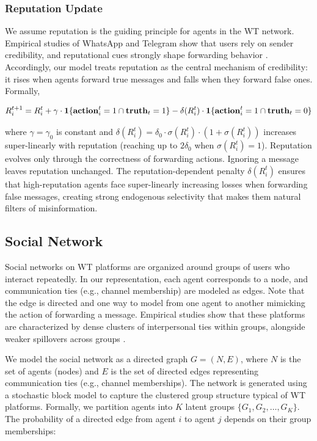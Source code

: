 \subsubsection{Reputation Update}
We assume reputation is the guiding principle for agents in the WT network. 
Empirical studies of WhatsApp and Telegram show that users rely on sender credibility, 
and reputational cues strongly shape forwarding behavior 
\citep{pasquetto2022social, herasimenka2022telegram}. 
Accordingly, our model treats reputation as the central mechanism of credibility: it rises 
when agents forward true messages and falls when they forward false ones. Formally,

\begin{equation}
R_i^{t+1} = R_i^t 
+ \gamma \cdot \mathbf{1}\{\mathbf{action}_i^t = 1 \cap \mathbf{truth}_t = 1\}
- \delta(R_i^t) \cdot \mathbf{1}\{\mathbf{action}_i^t = 1 \cap \mathbf{truth}_t = 0\}
\end{equation}

where $\gamma = \gamma_0$ is constant and $\delta(R_i^t) = \delta_0 \cdot \sigma(R_i^t) \cdot (1 + \sigma(R_i^t))$ increases super-linearly with reputation (reaching up to $2\delta_0$ when $\sigma(R_i^t) = 1$). 
Reputation evolves only through the correctness of forwarding actions. Ignoring a message leaves reputation unchanged. 
The reputation-dependent penalty $\delta(R_i^t)$ ensures that high-reputation agents face super-linearly increasing losses when forwarding 
false messages, creating strong endogenous selectivity that makes them natural filters of misinformation.

\subsection{Social Network}
Social networks on WT platforms are organized around 
groups of users who interact repeatedly. In our representation, each agent corresponds 
to a node, and communication ties (e.g., channel membership) are modeled as edges. Note that the edge is directed and one way to model from one agent to another mimicking the action of forwarding a message. Empirical studies show that these platforms are characterized by dense clusters 
of interpersonal ties within groups, alongside weaker spillovers across groups 
\citep{herasimenka2022telegram}. 

We model the social network as a directed graph $G = (N, E)$, where $N$ is the set of agents (nodes) and $E$ is the set of directed edges representing communication ties (e.g., channel memberships). The network is generated using a stochastic block model to capture the clustered group structure typical of WT platforms. Formally, we partition agents into $K$ latent groups $\{G_1, G_2, \ldots, G_K\}$. The probability of a directed edge from agent  $i$ to agent $j$ depends on their group memberships:

